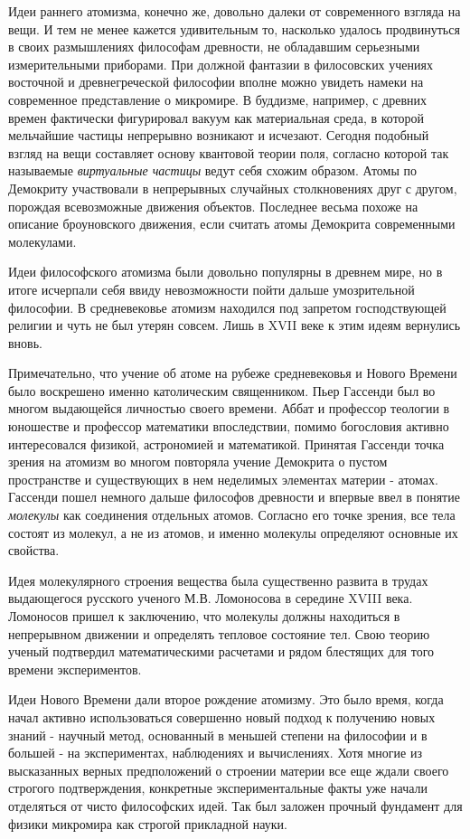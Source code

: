 Идеи раннего атомизма, конечно же, довольно далеки от современного взгляда на вещи.
И тем не менее кажется удивительным то, насколько удалось продвинуться в своих размышлениях философам древности, не обладавшим серьезными измерительными приборами.
При должной фантазии в филосовских учениях восточной и древнегреческой философии вполне можно увидеть намеки на современное представление о микромире.
В буддизме, например, с древних времен фактически фигурировал вакуум как материальная среда, в которой мельчайшие частицы непрерывно возникают и исчезают. 
Сегодня подобный взгляд на вещи составляет основу квантовой теории поля, согласно которой так называемые \textit{виртуальные частицы} ведут себя схожим образом. 
Атомы по Демокриту участвовали в непрерывных случайных столкновениях друг с другом, порождая всевозможные движения объектов. 
Последнее весьма похоже на описание броуновского движения, если считать атомы Демокрита современными молекулами.

Идеи философского атомизма были довольно популярны в древнем мире, но в итоге исчерпали себя ввиду невозможности пойти дальше умозрительной философии.
В средневековье атомизм находился под запретом господствующей религии и чуть не был утерян совсем.
Лишь в XVII веке к этим идеям вернулись вновь.

Примечательно, что учение об атоме на рубеже средневековья и Нового Времени было воскрешено именно католическим священником. 
Пьер Гассенди был во многом выдающейся личностью своего времени. 
Аббат и профессор теологии в юношестве и профессор математики впоследствии, помимо богословия активно интересовался физикой, астрономией и математикой. 
Принятая Гассенди точка зрения на атомизм во многом повторяла учение Демокрита о пустом пространстве и существующих в нем неделимых элементах материи - атомах. 
Гассенди пошел немного дальше философов древности и впервые ввел в понятие \textit{молекулы} как соединения отдельных атомов. 
Согласно его точке зрения, все тела состоят из молекул, а не из атомов, и именно молекулы определяют основные их свойства. 

Идея молекулярного строения вещества была существенно развита в трудах выдающегося русского ученого М.В. Ломоносова в середине XVIII века.
Ломоносов пришел к заключению, что молекулы должны находиться в непрерывном движении и определять тепловое состояние тел.
Свою теорию ученый подтвердил математическими расчетами и рядом блестящих для того времени экспериментов.

Идеи Нового Времени дали второе рождение атомизму.
Это было время, когда начал активно использоваться совершенно новый подход к получению новых знаний - научный метод, основанный в меньшей степени на философии и в большей - на экспериментах, наблюдениях и вычислениях.
Хотя многие из высказанных верных предположений о строении материи все еще ждали своего строгого подтверждения, конкретные экспериментальные факты уже начали отделяться от чисто философских идей.
Так был заложен прочный фундамент для физики микромира как строгой прикладной науки. 


